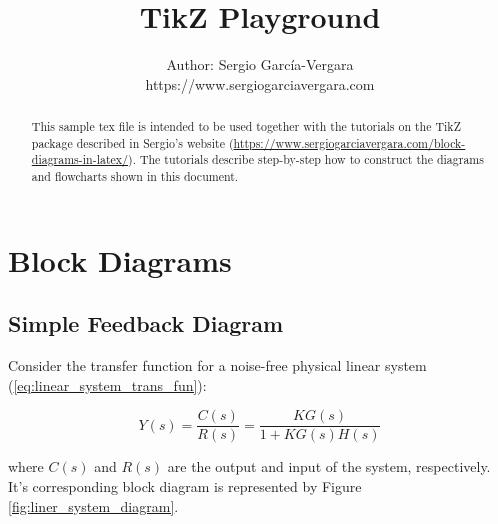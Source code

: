 \documentclass[11pt]{article}
\begin{document}

\title{TikZ Playground}
\author{
  Author: Sergio Garc\'{i}a-Vergara \\
  \small{https://www.sergiogarciavergara.com}
}

\maketitle


\begin{abstract}

  This sample tex file is intended to be used together with the tutorials on the
  TikZ package described in Sergio's website
  (\href{https://www.sergiogarciavergara.com/block-diagrams-in-latex/}{https://www.sergiogarciavergara.com/block-diagrams-in-latex/}). The
  tutorials describe step-by-step how to construct the diagrams and flowcharts
  shown in this document.

\end{abstract}



\section{Block Diagrams}

\subsection{Simple Feedback Diagram}

Consider the transfer function for a noise-free physical linear system
(\ref{eq:linear_system_trans_fun}):

\begin{equation}\label{eq:linear_system_trans_fun}
Y(s) = \frac{C(s)}{R(s)} = \frac{KG(s)}{1 + KG(s)H(s)}
\end{equation}

\noindent
where $C(s)$ and $R(s)$ are the output and input of the system,
respectively. It's corresponding block diagram is represented by Figure
\ref{fig:liner_system_diagram}.
\end{document}
